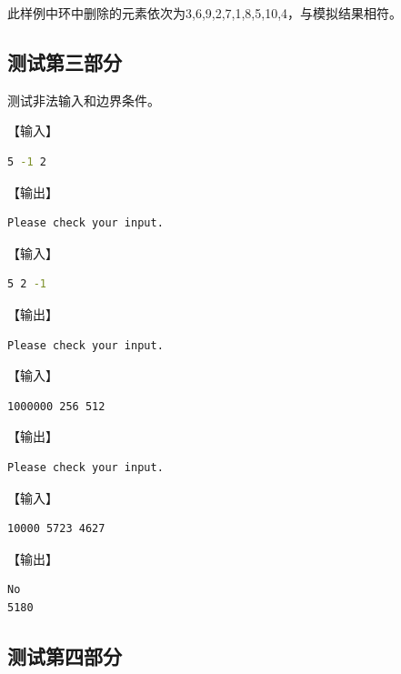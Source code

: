\documentclass{article}
\begin{document}
此样例中环中删除的元素依次为3,6,9,2,7,1,8,5,10,4，与模拟结果相符。

\subsection{测试第三部分}

测试非法输入和边界条件。

【输入】

\begin{lstlisting}[language={bash},
    basicstyle=\small\menlo]
5 -1 2
\end{lstlisting}

【输出】

\begin{lstlisting}[language={bash},
    basicstyle=\small\menlo]
Please check your input.
\end{lstlisting}

【输入】

\begin{lstlisting}[language={bash},
    basicstyle=\small\menlo]
5 2 -1
\end{lstlisting}

【输出】

\begin{lstlisting}[language={bash},
    basicstyle=\small\menlo]
Please check your input.
\end{lstlisting}

【输入】

\begin{lstlisting}[language={bash},
    basicstyle=\small\menlo]
1000000 256 512
\end{lstlisting}

【输出】

\begin{lstlisting}[language={bash},
    basicstyle=\small\menlo]
Please check your input.
\end{lstlisting}

【输入】

\begin{lstlisting}[language={bash},
    basicstyle=\small\menlo]
10000 5723 4627
\end{lstlisting}

【输出】

\begin{lstlisting}[language={bash},
    basicstyle=\small\menlo]
No
5180
\end{lstlisting}

\subsection{测试第四部分}
\end{document}

